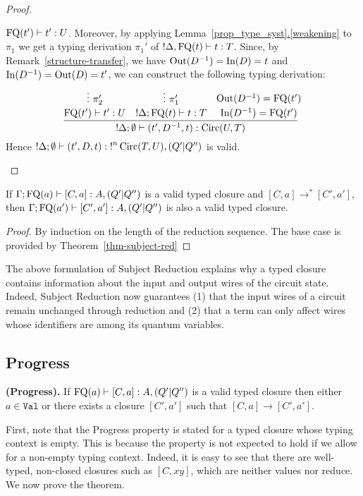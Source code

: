 \documentclass[twoside]{article}
\begin{document}
\begin{proof}
\begin{description}
\begin{itemize}
  $\mathop{\textrm{FQ}}\nolimits(t')\vdash t':U$. Moreover, by applying
  Lemma~\hyperref[weakening]{\ref*{prop_type_syst}.\ref*{weakening}} to $\pi_1$ 
  we get a typing derivation $\pi_1'$ of ${!}\Delta ,\mathop{\textrm{FQ}}\nolimits(t)\vdash t:T$.
  Since, by 
  Remark~\hyperref[structure-transfer]{\ref*{structure-transfer}}, 
  we have $\mathop{\textrm{Out}}\nolimits(D^{-1})=\mathop{\textrm{In}}\nolimits(D)=t$ and $\mathop{\textrm{In}}\nolimits(D^{-1})=\mathop{\textrm{Out}}\nolimits(D)=t'$, we can construct 
  the following typing derivation:
  \[
  \infer[]{{!}\Delta ;\emptyset\entails (t',D^{-1},t):\Circ(U,T)}{
    \deduce[]{\FQ(t')\entails t':U}{
      \vdots ~\pi_2'
    }
    &
    \deduce[]{{!}\Delta;\FQ(t)\entails t:T}{
      \vdots ~\pi_1'     
    }
    &
    \deduce[]{\In(D^{-1})=\FQ(t')}{
      \Out(D^{-1})=\FQ(t')
    }
  }  
  \]
  Hence ${!}\Delta;\emptyset\vdash (t',D,t):{!}^n\mathop{\textrm{Circ}}\nolimits(T,U),(Q'|Q'')$ 
  is valid.    
\end{itemize}
\end{description}
\end{proof}

\begin{corollary}
If $\Gamma;\mathop{\textrm{FQ}}\nolimits(a)\vdash [C,a]:A,(Q'|Q'')$ is a valid typed closure 
and $[C,a]\to^* [C',a']$, then $\Gamma;\mathop{\textrm{FQ}}\nolimits(a')\vdash [C',a']:A,(Q'|Q'')$ 
is also a valid typed closure.
\end{corollary}

\begin{proof}
By induction on the length of the reduction sequence. The base case is 
provided by Theorem~\hyperref[thm-subject-red]{\ref*{thm-subject-red}}
\end{proof}

The above formulation of Subject Reduction explains why a typed closure contains 
information about the input and output wires of the circuit state. Indeed, 
Subject Reduction now guarantees (1) that the input wires of a circuit 
remain unchanged through reduction and (2) that a term can only affect 
wires whose identifiers are among its quantum variables.

\subsection{Progress}

\begin{theorem}
{\bf (Progress).}
If $\mathop{\textrm{FQ}}\nolimits(a)\vdash [C,a]:A,(Q'|Q'')$ is a valid typed closure then either 
$a\in\mathtt{Val}$ or there exists a closure $[C',a']$ such that 
$[C,a]\to [C',a']$.
\end{theorem}

First, note that the Progress property is stated for a typed closure
whose typing context is empty. This is because the property is not
expected to hold if we allow for a non-empty typing context. Indeed,
it is easy to see that there are well-typed, non-closed closures such
as $[C,xy]$, which are neither values nor reduce. 
We now prove the theorem.
\end{document}
